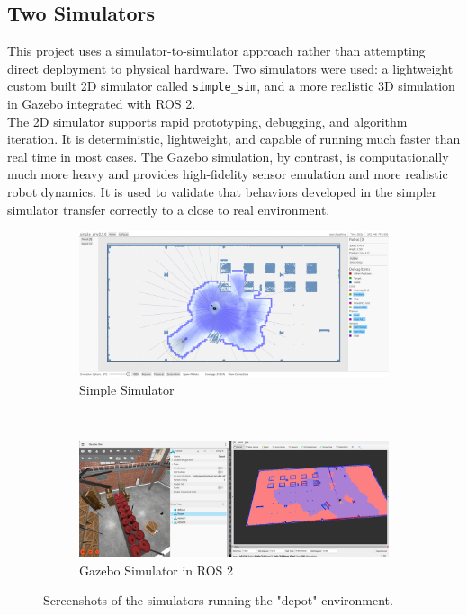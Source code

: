 \subsection{Two Simulators}
This project uses a simulator-to-simulator approach rather than attempting direct deployment to physical hardware. Two simulators were used: a lightweight custom built 2D simulator called \texttt{simple\_sim}, and a more realistic 3D simulation in Gazebo integrated with ROS 2. \\

The 2D simulator supports rapid prototyping, debugging, and algorithm iteration. It is deterministic, lightweight, and capable of running much faster than real time in most cases. The Gazebo simulation, by contrast, is computationally much more heavy and provides high-fidelity sensor emulation and more realistic robot dynamics. It is used to validate that behaviors developed in the simpler simulator transfer correctly to a close to real environment. \\

\def\w{0.95\textwidth}
\begin{figure}[H]
    \centering
    \begin{subfigure}[b]{\w}
        \centering
        \includegraphics[width=\textwidth]{./figures/screenshots/simple_sim_depot.png}
        \caption{Simple Simulator}
        \label{fig:simple_sim}
    \end{subfigure} \\
    \vspace{3mm}
    \begin{subfigure}[b]{\w}
        \centering
        \includegraphics[width=\textwidth]{./figures/screenshots/gazebo_sim_depot.png}
        \caption{Gazebo Simulator in ROS 2}
        \label{fig:gazebo_sim}
    \end{subfigure}
    \caption{Screenshots of the simulators running the "depot" environment.}
    \label{fig:simulators}
\end{figure}

